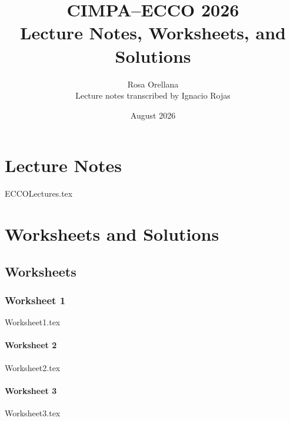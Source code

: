\documentclass[12pt]{memoir}
\title{CIMPA--ECCO 2026\\
Lecture Notes, Worksheets, and Solutions}
\author{Rosa Orellana\\[0.5em]
{\large Lecture notes transcribed by Ignacio Rojas}}
\date{August 2026}
\newcommand{\worksheetnumbering}{%
  \renewcommand{\theenumi}{\arabic{enumi}}%
  \renewcommand{\labelenumi}{\theenumi.}%
  \renewcommand{\theenumii}{\alph{enumii}}%
  \renewcommand{\labelenumii}{(\theenumii)}%
}
\newcommand{\worksheetimportsetup}{%
  \let\maketitle\relax
  \let\section\subsection
  \let\bf\bfseries
  \worksheetnumbering
}
\begin{document}
\frontmatter
\maketitle
\clearpage
\tableofcontents

\mainmatter
\part{Lecture Notes}

\begingroup
\let\lecturenewpage\newpage
\let\lecturechapter\chapter
\renewcommand{\chapter}{\lecturenewpage\lecturechapter}
\let\newpage\relax
{ECCOLectures.tex}
\endgroup

\part{Worksheets and Solutions}

\chapter{Worksheets}

\section{Worksheet 1}
\begingroup
\worksheetimportsetup
{Worksheet1.tex}
\endgroup

\clearpage
\section{Worksheet 2}
\begingroup
\worksheetimportsetup
{Worksheet2.tex}
\endgroup

\clearpage
\section{Worksheet 3}
\begingroup
\worksheetimportsetup
{Worksheet3.tex}
\endgroup
\end{document}
